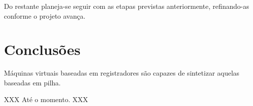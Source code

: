 Do restante planeja-se seguir com as etapas previstas anteriormente,
refinando-as conforme o projeto avança.


\section{Conclusões}

Máquinas virtuais baseadas em registradores são capazes de sintetizar
aquelas baseadas em pilha.

XXX Até o momento. XXX


\let\stdsection\section
\def\section*#1{\stdsection{#1}}

\let\section\stdsection
